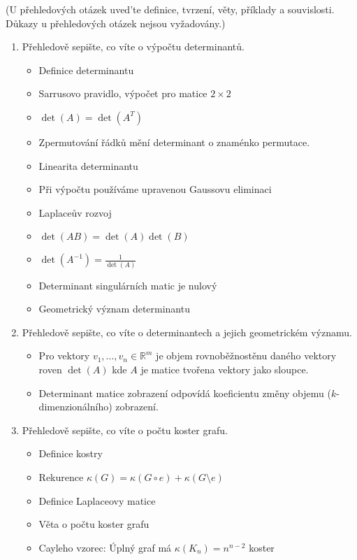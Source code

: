 \documentclass[10pt,a4paper]{article}
\theoremstyle{plain}
\begin{document}
(U přehledových otázek uved'te definice, tvrzení, věty, příklady a souvislosti. Důkazy u přehledových otázek nejsou vyžadovány.)
\begin{enumerate}
\item Přehledově sepište, co víte o výpočtu determinantů.

\begin{itemize}
\item Definice determinantu
\item Sarrusovo pravidlo, výpočet pro matice $2 \times 2$
\item $\det(A) = \det(A^T)$
\item Zpermutování řádků mění determinant o znaménko permutace.
\item Linearita determinantu
\item Při výpočtu používáme upravenou Gaussovu eliminaci
\item Laplaceův rozvoj
\item $\det(AB) = \det(A) \det(B)$
\item $\det(A^{-1})=\frac{1}{\det(A)}$
\item Determinant singulárních matic je nulový
\item Geometrický význam determinantu
\end{itemize}

\item Přehledově sepište, co víte o determinantech a jejich geometrickém významu.
\begin{itemize}
\item Pro vektory $v_1, ..., v_n \in \mathbb{R}^m$ je objem rovnoběžnostěnu daného vektory roven $\det(A)$ kde $A$ je matice tvořena vektory jako sloupce.
\item Determinant matice zobrazení odpovídá koeficientu změny objemu ($k$-dimenzionálního) zobrazení. 
\end{itemize}

\item Přehledově sepište, co víte o počtu koster grafu.
\begin{itemize}
\item Definice kostry
\item Rekurence $\kappa(G) = \kappa(G \circ e) + \kappa(G \setminus e)$
\item Definice Laplaceovy matice
\item Věta o počtu koster grafu
\item Cayleho vzorec: Úplný graf má $\kappa(K_n) = n^{n-2}$ koster
\end{itemize}


\end{enumerate}
\end{document}
